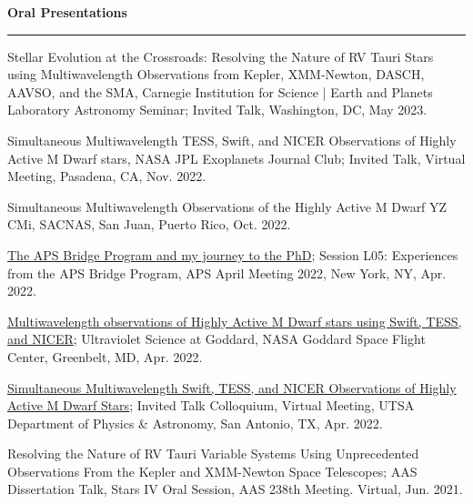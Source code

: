 \documentclass[letter,11pt]{article}
\begin{document}

\noindent
{\bf Oral Presentations} \\
\vspace{-10mm}
\begin{center}
\rule{\textwidth}{0.2mm}
\end{center}
\vspace{-3mm}
\noindent
\begin{etaremune}
\renewcommand\labelenumi{\bfseries\theenumi .}

\item Stellar Evolution at the Crossroads: Resolving the Nature of RV Tauri Stars using Multiwavelength Observations from Kepler, XMM-Newton, DASCH, AAVSO, and the SMA, Carnegie Institution for Science | Earth and Planets Laboratory Astronomy Seminar; Invited Talk, Washington, DC, May 2023.

\item Simultaneous Multiwavelength TESS, Swift, and NICER Observations of Highly Active M Dwarf stars, NASA JPL Exoplanets Journal Club; Invited Talk, Virtual Meeting, Pasadena, CA, Nov. 2022.

\item Simultaneous Multiwavelength Observations of the Highly Active M Dwarf YZ CMi, SACNAS, San Juan, Puerto Rico, Oct. 2022.

\item \href{https://meetings.aps.org/Meeting/APR22/Session/L05.1}{The APS Bridge Program and my journey to the PhD}; Session L05: Experiences from the APS Bridge Program, APS April Meeting 2022, New York, NY, Apr. 2022.

\item \href{https://asd.gsfc.nasa.gov/conferences/UVsymposium2022/agenda/}{Multiwavelength observations of Highly Active M Dwarf stars using Swift, TESS, and NICER}; Ultraviolet Science at Goddard, NASA Goddard Space Flight Center, Greenbelt, MD, Apr. 2022.

\item \href{https://twitter.com/UTSA_PhyAst/status/1508503792261779464?s=20&t=dVQ_0wPfIXmUPicaAi6VLg}{Simultaneous Multiwavelength Swift, TESS, and NICER Observations of Highly Active M Dwarf Stars}; Invited Talk Colloquium, Virtual Meeting, UTSA Department of Physics \& Astronomy, San Antonio, TX, Apr. 2022. 

\item Resolving the Nature of RV Tauri Variable Systems Using Unprecedented Observations From the Kepler and XMM-Newton Space Telescopes; AAS Dissertation Talk, Stars IV Oral Session, AAS 238th Meeting. Virtual, Jun. 2021.


\end{etaremune}
\end{document}
